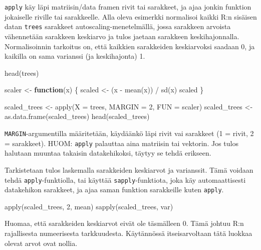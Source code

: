 \documentclass[
]{book}
\newenvironment{Shaded}{\begin{snugshade}}{\end{snugshade}}
\newcommand{\AttributeTok}[1]{\textcolor[rgb]{0.77,0.63,0.00}{#1}}
\newcommand{\ControlFlowTok}[1]{\textcolor[rgb]{0.13,0.29,0.53}{\textbf{#1}}}
\newcommand{\DecValTok}[1]{\textcolor[rgb]{0.00,0.00,0.81}{#1}}
\newcommand{\FunctionTok}[1]{\textcolor[rgb]{0.00,0.00,0.00}{#1}}
\newcommand{\NormalTok}[1]{#1}
\newcommand{\OtherTok}[1]{\textcolor[rgb]{0.56,0.35,0.01}{#1}}
\newcommand{\SpecialCharTok}[1]{\textcolor[rgb]{0.00,0.00,0.00}{#1}}
\begin{document}
\texttt{apply} käy läpi matriisin/data framen rivit tai sarakkeet, ja ajaa jonkin funktion jokaiselle riville tai sarakkeelle. Alla oleva esimerkki normalisoi kaikki R:n sisäisen datan \texttt{trees} sarakkeet autoscaling-menetelmällä, jossa sarakkeen arvoista vähennetään sarakkeen keskiarvo ja tulos jaetaan sarakkeen keskihajonnalla. Normalisoinnin tarkoitus on, että kaikkien sarakkeiden keskiarvoksi saadaan 0, ja kaikilla on sama varianssi (ja keskihajonta) 1.

\begin{Shaded}
\begin{Highlighting}[]
\FunctionTok{head}\NormalTok{(trees)}

\NormalTok{scaler }\OtherTok{\textless{}{-}} \ControlFlowTok{function}\NormalTok{(x) \{}
\NormalTok{  scaled }\OtherTok{\textless{}{-}}\NormalTok{ (x }\SpecialCharTok{{-}} \FunctionTok{mean}\NormalTok{(x)) }\SpecialCharTok{/} \FunctionTok{sd}\NormalTok{(x)}
\NormalTok{  scaled}
\NormalTok{\}}

\NormalTok{scaled\_trees }\OtherTok{\textless{}{-}} \FunctionTok{apply}\NormalTok{(}\AttributeTok{X =}\NormalTok{ trees, }\AttributeTok{MARGIN =} \DecValTok{2}\NormalTok{, }\AttributeTok{FUN =}\NormalTok{ scaler)}
\NormalTok{scaled\_trees }\OtherTok{\textless{}{-}} \FunctionTok{as.data.frame}\NormalTok{(scaled\_trees)}
\FunctionTok{head}\NormalTok{(scaled\_trees)}
\end{Highlighting}
\end{Shaded}

\texttt{MARGIN}-argumentilla määritetään, käydäänkö läpi rivit vai sarakkeet (1 = rivit, 2 = sarakkeet). HUOM: \texttt{apply} palauttaa aina matriisin tai vektorin. Jos tulos halutaan muuntaa takaisin datakehikoksi, täytyy se tehdä erikseen.

Tarkistetaan tulos laskemalla sarakkeiden keskiarvot ja varianssit. Tämä voidaan tehdä \texttt{apply}-funktiolla, tai käyttää \texttt{sapply}-funktiota, joka käy automaattisesti datakehikon sarakkeet, ja ajaa saman funktion sarakkeille kuten \texttt{apply}.

\begin{Shaded}
\begin{Highlighting}[]
\FunctionTok{apply}\NormalTok{(scaled\_trees, }\DecValTok{2}\NormalTok{, mean)}
\FunctionTok{sapply}\NormalTok{(scaled\_trees, var)}
\end{Highlighting}
\end{Shaded}

Huomaa, että sarakkeiden keskiarvot eivät ole täsmälleen 0. Tämä johtuu R:n rajallisesta numeerisesta tarkkuudesta. Käytännössä itseisarvoltaan tätä luokkaa olevat arvot ovat nollia.
\end{document}
